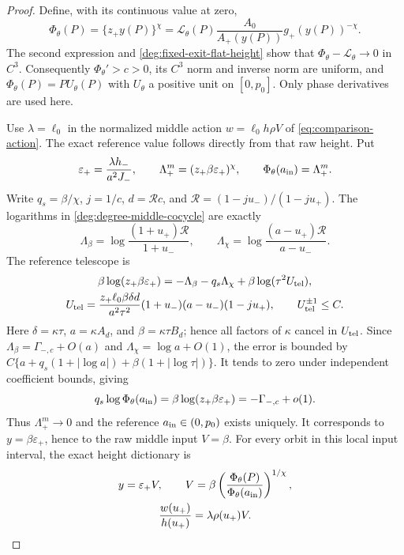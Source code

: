 \begin{proof}
Define, with its continuous value at zero,
\begin{equation}\label{deg:fixed-exit-exact-weak-coordinate}
 \Phi_\theta(P)=\{z_+y(P)\}^{\chi}
 =\mathscr L_\theta(P)\frac{A_0}{A_+(y(P))}
                          g_+(y(P))^{-\chi}.
\end{equation}
The second expression and \eqref{deg:fixed-exit-flat-height} show
that \(\Phi_\theta-\mathscr L_\theta\to0\) in \(C^3\).
Consequently \(\Phi_\theta'>c>0\), its \(C^3\) norm and inverse
norm are uniform, and \(\Phi_\theta(P)=PU_\theta(P)\) with
\(U_\theta\) a positive unit on \([0,p_0]\).
Only phase derivatives are used here.

Use \(\lambda=\ell_0\) in the normalized middle action
\(w=\ell_0h\rho V\) of \eqref{eq:comparison-action}.
The exact reference value follows directly from that raw height. Put
\[
 \varepsilon_+=\frac{\lambda h_-}{a^2J_-},\qquad
 \Lambda_+^m=(z_+\beta\varepsilon_+)^\chi,
 \qquad
 \Phi_\theta(a_{\rm in})=\Lambda_+^m.
\]
Write \(q_s=\beta/\chi\), \(j=1/c\), \(d=\mathcal Rc\), and
\(\mathscr R=(1-ju_-)/(1-ju_+)\). The logarithms in
\eqref{deg:degree-middle-cocycle} are exactly
\[
 \Lambda_\beta=\log\frac{(1+u_+)\mathscr R}{1+u_-},\qquad
 \Lambda_\chi=\log\frac{(a-u_+)\mathscr R}{a-u_-}.
\]
The reference telescope is
\begin{equation}\label{p2:reference-telescope}
 \begin{gathered}
 \beta\log(z_+\beta\varepsilon_+)
 =-\Lambda_\beta-q_s\Lambda_\chi+\beta\log(\tau^2U_{\rm tel}),\\
 U_{\rm tel}=\frac{z_+\ell_0\beta\delta d}{a^2\tau^2}
                (1+u_-)(a-u_-)(1-ju_+),\qquad U_{\rm tel}^{\pm1}\le C.
 \end{gathered}
\end{equation}
Here \(\delta=\kappa\tau\), \(a=\kappa A_d\), and
\(\beta=\kappa\tau B_d\); hence all factors of \(\kappa\)
cancel in \(U_{\rm tel}\). Since
\(\Lambda_\beta=\Gamma_{-,c}+O(a)\) and
\(\Lambda_\chi=\log a+O(1)\), the error is bounded by
\(C\{a+q_s(1+|\log a|)+\beta(1+|\log\tau|)\}\).
It tends to zero under independent coefficient bounds, giving
\begin{equation}\label{deg:degree-fixed-exit-gap}
 q_s\log\Phi_\theta(a_{\rm in})
 =\beta\log(z_+\beta\varepsilon_+)
 =-\Gamma_{-,c}+o(1).
\end{equation}
Thus \(\Lambda_+^m\to0\) and the reference
\(a_{\rm in}\in(0,p_0)\) exists uniquely. It corresponds to
\(y=\beta\varepsilon_+\), hence to the raw middle input \(V=\beta\).
For every orbit in this local input interval, the exact height dictionary is
\begin{equation}\label{fx:height-dictionary}
 \begin{gathered}
 y=\varepsilon_+V,\qquad
 V=\beta\left(\frac{\Phi_\theta(P)}
                    {\Phi_\theta(a_{\rm in})}\right)^{1/\chi},\\
 \frac{w(u_+)}{h(u_+)}=\lambda\rho(u_+)V.
 \end{gathered}
\end{equation}


\end{proof}
